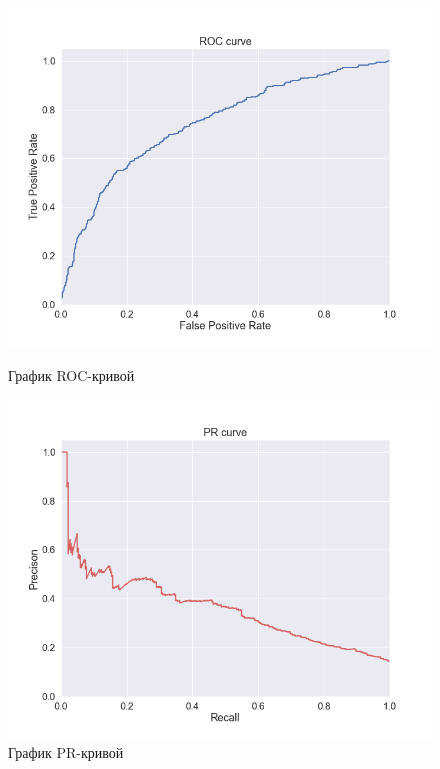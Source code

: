 \begin{figure}[h!]
\centering
\begin{minipage}{.5\textwidth}
\centering
\includegraphics[width=1.1\linewidth]{images/roc_curve_example}
\caption{График ROC-кривой}
\label{fig:roc_curve_example}
\end{minipage}%
\begin{minipage}{.5\textwidth}
\centering
\includegraphics[width=1.1\linewidth]{images/pr_curve_example}
\caption{График PR-кривой}
\label{fig:pr_curve_example}
\end{minipage}
\end{figure}

